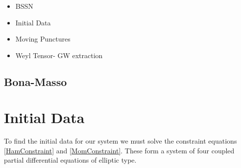 %
%

\begin{itemize}
\item BSSN
\item Initial Data
\item Moving Punctures
\item Weyl Tensor- GW extraction
\end{itemize}
 


\subsection{Bona-Masso}

\section{Initial Data}
To find the initial data for our system we must solve the constraint equations \ref{HamConstraint} and \ref{MomConstraint}. These form a system of four coupled partial differential equations of elliptic type. 

